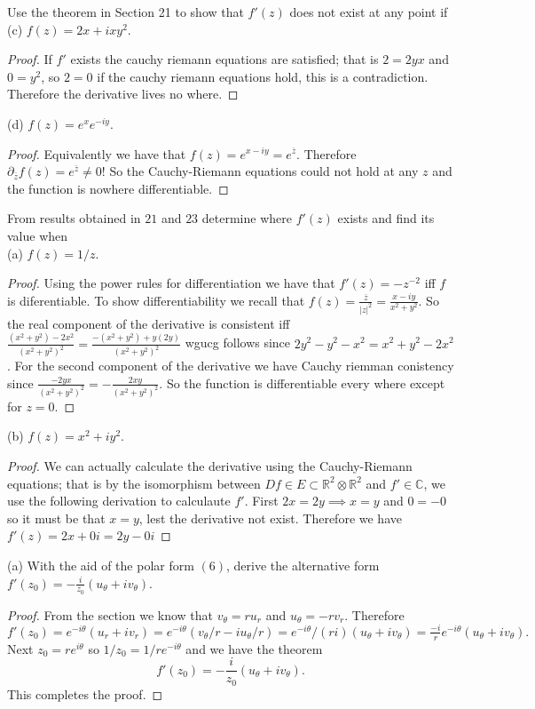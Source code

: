 \documentclass[11pt]{amsart}
\theoremstyle{definition}
\numberwithin{theorem}{section}
\numberwithin{definition}{section}
\numberwithin{equation}{section}
\begin{document}
\medskip {} Use the theorem in Section 21 to show that $f'(z)$ does not exist at any point if \\
\noindent (c) $f(z) = 2x +ixy^2$.
\begin{proof}
  If $f'$  exists the cauchy riemann equations are satisfied; that is $2 = 2yx$ and $0 = y^2$, so $2 = 0$ if the cauchy riemann equations hold, this is a contradiction. Therefore the derivative lives no where.
\end{proof}
\noindent(d) $f(z) = e^xe^{-iy}$.
\begin{proof}
  Equivalently we have that $f(z) = e^{x -iy} = e^{\overline{z}}.$ Therefore $\partial_{\overline{z}} f(z) = e^{\overline{z}} \neq 0$! So the Cauchy-Riemann equations could not hold at any $z$ and the function is nowhere differentiable.
\end{proof}
\medskip {} From results obtained in $21$ and $23$ determine where $f'(z)$ exists and find its value when \\(a) $f(z) = 1/z$.
\begin{proof}
  Using the power rules for differentiation we have that $f'(z) = -z^{-2}$ iff $f$ is diferentiable. To show differentiability we recall that $f(z) = \frac{\overline{z}}{|z|^2} = \frac{x -iy}{x^2 + y^2}$. So the real component of the derivative is consistent iff $\frac{(x^2+y^2) -2x^2}{(x^2+y^2)^2} = \frac{-(x^2+y^2) +y(2y)}{(x^2+y^2)^2}$ wgucg follows since $2y^2 -y^2 -x^2 = x^2 +y^2 - 2x^2$. For the second component of the derivative we have Cauchy riemman conistency since $\frac{-2yx}{(x^2 + y^2)^2} = -\frac{2xy}{(x^2 + y^2)^2}$. So the function is differentiable every where except for $z = 0$.
\end{proof}
\noindent (b) $f(z) = x^2 + iy^2$.
\begin{proof}
  We can actually calculate the derivative using the Cauchy-Riemann equations; that is by the isomorphism between $Df \in E \subset \mathbb{R}^2 \otimes \mathbb{R}^2$ and $f' \in \mathbb{C}$, we use the following derivation to calculaute $f'$. First $2x =2y \implies x=y$ and $0 = -0$ so it must be that $x = y$, lest the derivative not exist. Therefore we have $f'(z) = 2x + 0i= 2y -0i$
\end{proof}

\medskip {} (a) With the aid of the polar form $(6)$, derive the alternative form $f'(z_0) = -\frac{i}{z_0}(u_\theta + iv_\theta)$.
\begin{proof}
  From the section we know that $v_\theta = ru_r$ and $u_\theta = -rv_r$. Therefore $f'(z_0) = e^{-i\theta}(u_r + iv_r) = e^{-i\theta}(v_\theta/r - iu_\theta/r) = e^{-i\theta}/(ri)(u_\theta + i v_\theta) = \frac{-i}{r}e^{-i\theta}(u_\theta + i v_\theta).$ Next $z_0 = re^{i\theta}$ so $1/z_0 = 1/re^{-i\theta}$ and we have the theorem
  \begin{equation*}
    f'(z_0) = -\frac{i}{z_0}(u_\theta + iv_\theta).
  \end{equation*}
  This completes the proof.
\end{proof}
\end{document}

